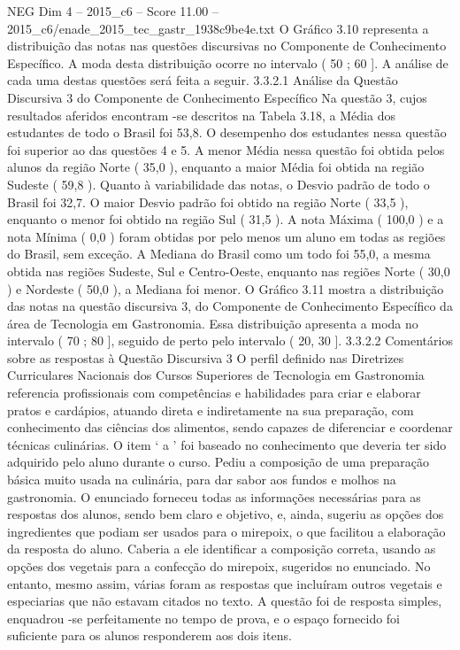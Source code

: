 \begin{textsample}{NEG Dim 4 – 2015\_c6 – Score 11.00 – 2015\_c6/enade\_2015\_tec\_gastr\_1938c9be4e.txt}
O Gráfico 3.10 representa a distribuição das notas nas questões discursivas no Componente de Conhecimento Específico.
A moda desta distribuição ocorre no intervalo ( 50 ; 60 ].
A análise de cada uma destas questões será feita a seguir. 3.3.2.1 Análise da Questão Discursiva 3 do Componente de Conhecimento Específico Na questão 3, cujos resultados aferidos encontram -se descritos na Tabela 3.18, a Média dos estudantes de todo o Brasil foi 53,8.
O desempenho dos estudantes nessa questão foi superior ao das questões 4 e 5.
A menor Média nessa questão foi obtida pelos alunos da região Norte ( 35,0 ), enquanto a maior Média foi obtida na região Sudeste ( 59,8 ).
Quanto à variabilidade das notas, o Desvio padrão de todo o Brasil foi 32,7.
O maior Desvio padrão foi obtido na região Norte ( 33,5 ), enquanto o menor foi obtido na região Sul ( 31,5 ).
A nota Máxima ( 100,0 ) e a nota Mínima ( 0,0 ) foram obtidas por pelo menos um aluno em todas as regiões do Brasil, sem exceção.
A Mediana do Brasil como um todo foi 55,0, a mesma obtida nas regiões Sudeste, Sul e Centro-Oeste, enquanto nas regiões Norte ( 30,0 ) e Nordeste ( 50,0 ), a Mediana foi menor.
O Gráfico 3.11 mostra a distribuição das notas na questão discursiva 3, do Componente de Conhecimento Específico da área de Tecnologia em Gastronomia.
Essa distribuição apresenta a moda no intervalo ( 70 ; 80 ], seguido de perto pelo intervalo ( 20, 30 ]. 3.3.2.2 Comentários sobre as respostas à Questão Discursiva 3 O perfil definido nas Diretrizes Curriculares Nacionais dos Cursos Superiores de Tecnologia em Gastronomia referencia profissionais com competências e habilidades para criar e elaborar pratos e cardápios, atuando direta e indiretamente na sua preparação, com conhecimento das ciências dos alimentos, sendo capazes de diferenciar e coordenar técnicas culinárias.
O item ‘ a ’ foi baseado no conhecimento que deveria ter sido adquirido pelo aluno durante o curso.
Pediu a composição de uma preparação básica muito usada na culinária, para dar sabor aos fundos e molhos na gastronomia.
O enunciado forneceu todas as informações necessárias para as respostas dos alunos, sendo bem claro e objetivo, e, ainda, sugeriu as opções dos ingredientes que podiam ser usados para o mirepoix, o que facilitou a elaboração da resposta do aluno.
Caberia a ele identificar a composição correta, usando as opções dos vegetais para a confecção do mirepoix, sugeridos no enunciado.
No entanto, mesmo assim, várias foram as respostas que incluíram outros vegetais e especiarias que não estavam citados no texto.
A questão foi de resposta simples, enquadrou -se perfeitamente no tempo de prova, e o espaço fornecido foi suficiente para os alunos responderem aos dois itens.

\end{textsample}
